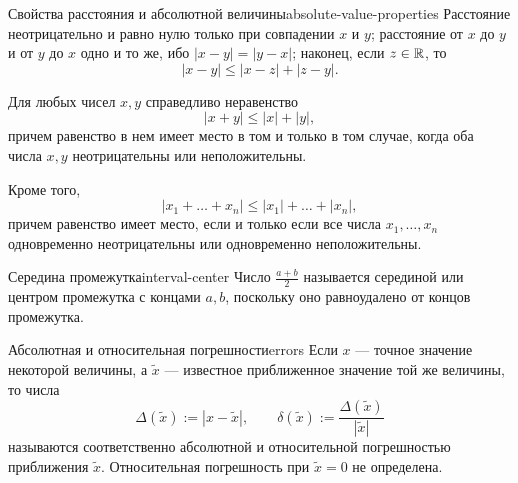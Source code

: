 \begin{properties}{Свойства расстояния и абсолютной величины}{absolute-value-properties}
  Расстояние неотрицательно и равно нулю только при совпадении $x$ и $y$;
  расстояние от $x$ до $y$ и от $y$ до $x$ одно и то же, ибо
  $|x-y|=|y-x|$; наконец, если $z\in\mathbb{R}$, то
  \[
    |x-y|\le|x-z|+|z-y|.
  \]

  Для любых чисел $x,y$ справедливо неравенство
  \[
    |x+y|\le|x|+|y|,
  \]
  причем равенство в нем имеет место в том и только в том случае, когда оба
  числа $x,y$ неотрицательны или неположительны.

  Кроме того,
  \[
    |x_1+\ldots+x_n|\le|x_1|+\ldots+|x_n|,
  \]
  причем равенство имеет место, если и только если все числа
  $x_1,\ldots,x_n$ одновременно неотрицательны или одновременно
  неположительны.
\end{properties}

\begin{definition}{Середина промежутка}{interval-center}
  Число $\frac{a+b}{2}$ называется серединой или центром промежутка с
  концами $a,b$, поскольку оно равноудалено от концов промежутка.
\end{definition}

\begin{definition}{Абсолютная и относительная погрешности}{errors}
  Если $x$ — точное значение некоторой величины, а $\widetilde{x}$ — известное
  приближенное значение той же величины, то числа
  \[
    \Delta(\widetilde{x}):=|x-\widetilde{x}|,
    \qquad
    \delta(\widetilde{x}):=
      \frac{\Delta(\widetilde{x})}{|\widetilde{x}|}
  \]
  называются соответственно абсолютной и относительной погрешностью
  приближения $\widetilde{x}$. Относительная погрешность при
  $\widetilde{x}=0$ не определена.
\end{definition}


